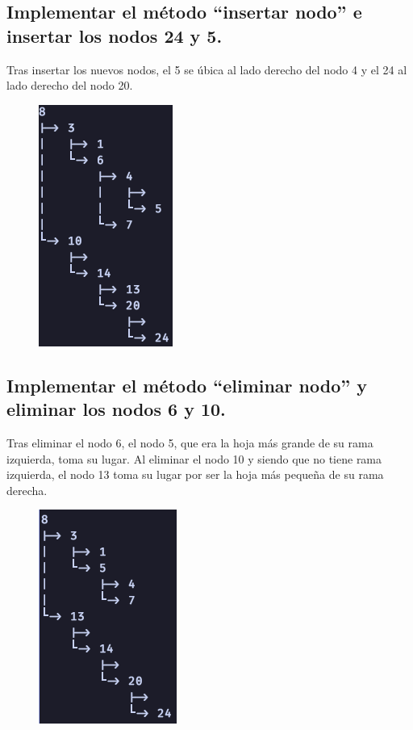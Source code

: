 \documentclass[a4paper,notitlepage]{article}
\begin{document}
\pagebreak

\subsection{Implementar el método “insertar nodo” e insertar los nodos 24 y 5.}
Tras insertar los nuevos nodos, el 5 se úbica al lado derecho del nodo 4 y el
24 al lado derecho del nodo 20.

\begin{figure}[H]
    \centering
    \includegraphics[scale=0.65]{imgs/insert-nodes.png}
\end{figure}

\subsection{Implementar el método “eliminar nodo” y eliminar los nodos 6 y 10.}
Tras eliminar el nodo 6, el nodo 5, que era la hoja más grande de su rama
izquierda, toma su lugar. Al eliminar el nodo 10 y siendo que no tiene rama
izquierda, el nodo 13 toma su lugar por ser la hoja más pequeña de su rama
derecha.

\begin{figure}[H]
    \centering
    \includegraphics[scale=0.65]{imgs/delete-nodes.png}
\end{figure}
\end{document}
